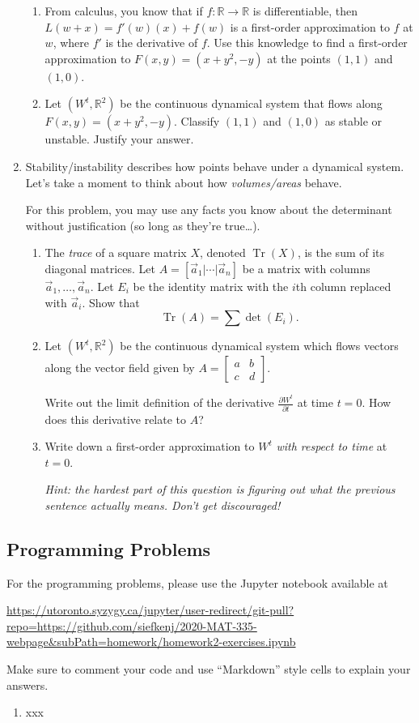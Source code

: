 \documentclass[letter]{article}
\newcommand{\R}{\mathbb{R}}
\newcommand{\mat}[1]{\begin{bmatrix}#1\end{bmatrix}}
\DeclareMathOperator{\Tr}{Tr}
\begin{document}
\begin{enumerate}
\begin{enumerate}
				\item From calculus, you know that if $f:\R\to\R$ is differentiable, then $L(w+x)=f'(w)(x)+f(w)$ is a
					first-order approximation to $f$ at $w$, where $f'$ is the derivative of $f$. Use this knowledge
					to find a first-order approximation to $F(x,y) = (x+y^2,-y)$ at the points $(1,1)$ and $(1,0)$.
				\item Let $(W^t,\R^2)$ be the continuous dynamical system that flows along $F(x,y)=(x+y^2,-y)$.
					Classify $(1,1)$ and $(1,0)$ as stable or unstable. Justify your answer.
			\end{enumerate}
		\item Stability/instability describes how points behave under a dynamical system. Let's take a moment to think about
			how \emph{volumes/areas} behave.

			For this problem, you may use any facts you know about the determinant without justification (so long as they're true\ldots).

			\begin{enumerate}
				\item The \emph{trace} of a square matrix $X$, denoted $\Tr(X)$,
					is the sum of its diagonal matrices. Let $A=[\vec a_1|\cdots|\vec a_n]$
					be a matrix with columns $\vec a_1,\ldots,\vec a_n$.  Let $E_i$ be the identity matrix with
					the $i$th column replaced with $\vec a_i$. Show that
					\[
						\Tr(A) = \sum \det(E_i).
					\]
				\item Let $(W^t,\R^2)$ be the continuous dynamical system which flows vectors along the vector field given
					by $A=\mat{a&b\\c&d}$.

					Write out the limit definition of the derivative $\frac{\partial W^t}{\partial t}$ at time $t=0$.
					How does this derivative relate to $A$?
				\item Write down a first-order approximation to $W^t$ \emph{with respect to time} at $t=0$.

					\emph{Hint: the hardest part of this question is figuring out what the previous sentence actually
					means. Don't get discouraged!}


			\end{enumerate}


	\end{enumerate}


	\subsection*{Programming Problems}
	For the programming problems, please use the Jupyter notebook available at

	\url{https://utoronto.syzygy.ca/jupyter/user-redirect/git-pull?repo=https://github.com/siefkenj/2020-MAT-335-webpage&subPath=homework/homework2-exercises.ipynb}

	Make sure to comment your code and use ``Markdown'' style cells to explain your answers.

	\begin{enumerate}

		\item xxx
	\end{enumerate}
\end{document}
